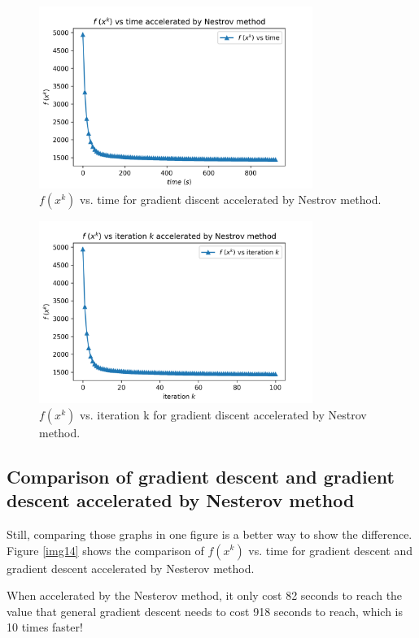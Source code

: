 \documentclass{article}
\begin{document}
\begin{figure}[h]
  \includegraphics[width=3.5in]{pic12.png}
  \centering
  \caption{$f(x^{k})$ vs. time for gradient discent accelerated by Nestrov method.}
  \label{img12}
\end{figure}

\begin{figure}[h]
  \includegraphics[width=3.5in]{pic13.png}
  \centering
  \caption{$f(x^{k})$ vs. iteration k for gradient discent accelerated by Nestrov method.}
  \label{img13}
\end{figure}



\subsection{Comparison of gradient descent and gradient descent accelerated by Nesterov method}

Still, comparing those graphs in one figure is a better way to show the difference. Figure \ref{img14} shows the comparison of $f(x^{k})$ vs. time for gradient descent and gradient descent accelerated by Nesterov method. 

When accelerated by the Nesterov method, it only cost 82 seconds to reach the value that general gradient descent needs to cost 918 seconds to reach, which is 10 times faster! 
\end{document}
